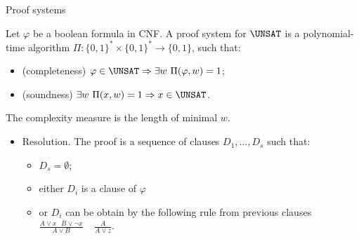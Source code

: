 \begin{frame}{Proof systems}

    \begin{definition}
        Let $\varphi$ be a boolean formula in CNF. A proof system for $\UNSAT$ is a polynomial-time algorithm $\Pi: \{0,
        1\}^* \times \{0, 1\}^* \rightarrow \{0, 1\}$, such that: 
        \begin{itemize}
            \item (completeness) $\varphi \in \UNSAT \Rightarrow \exists w ~ \Pi(\varphi, w) = 1$;
            \item (soundness) $\exists w ~ \Pi(x, w) = 1 \Rightarrow x \in \UNSAT$.
        \end{itemize}
    \end{definition}

    The complexity measure is the length of minimal $w$.
    \pause

    \vspace{0.3cm}

    \begin{itemize}
        \item Resolution. The proof is a sequence of clauses $D_1, \dots, D_s$ such that:
            \begin{itemize}
                \item $D_s = \emptyset$;
                \item either $D_i$ is a clause of $\varphi$
                \item or $D_i$ can be obtain by the following rule from previous clauses $\frac{A \lor x ~~~ B \lor \neg x}{A
                    \lor B} ~~~~~ \frac{A}{A \lor z}$.
            \end{itemize}
    \end{itemize}
\end{frame}

